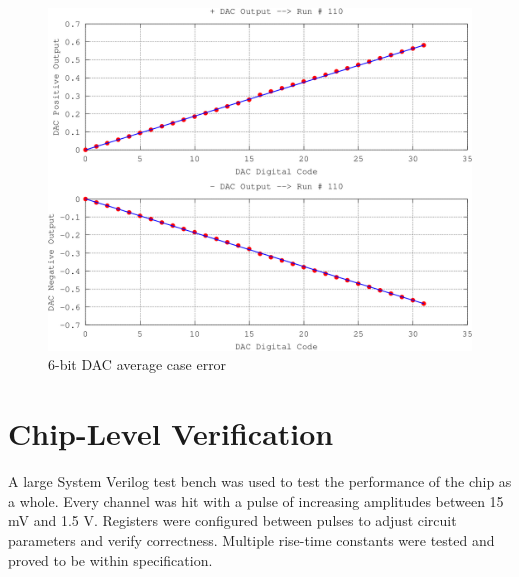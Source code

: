 \documentclass[12pt,oneside,final]{siuethesis}
\theoremstyle{definition}
\begin{document}
\begin{figure}[htbp!]
 \centering
 \includegraphics[scale=.3]{./ch4_figures/dac_average.png}
 \caption{6-bit DAC average case error}
 \label{fig:dac-average}
\end{figure} 

\section{Chip-Level Verification}
\par A large System Verilog test bench was used to test the performance of the chip as a whole. Every channel was hit with a pulse of increasing amplitudes between 15 mV and 1.5 V. Registers were configured between pulses to adjust circuit parameters and verify correctness. Multiple rise-time constants were tested and proved to be within specification. 
\end{document}
